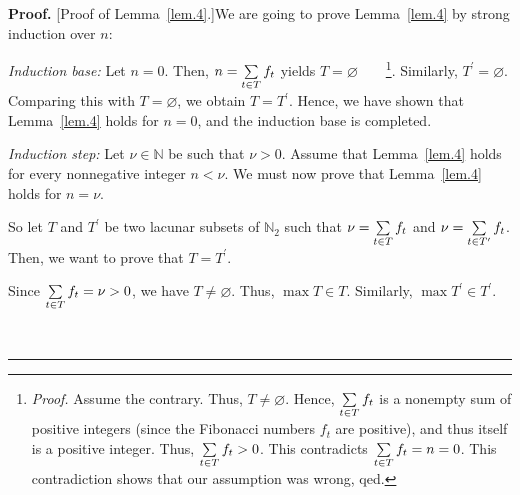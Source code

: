 \documentclass[numbers=enddot,12pt,final,onecolumn,notitlepage]{scrartcl}%
\numberwithin{exer}{section}
\theoremstyle{definition}
\newenvironment{proof}[1][Proof]{\noindent\textbf{#1.} }{\ \rule{0.5em}{0.5em}}
\let\sumnonlimits\sum
\renewcommand{\sum}{\sumnonlimits\limits}
\begin{document}
\begin{proof}
[Proof of Lemma~\ref{lem.4}.]We are going to prove Lemma~\ref{lem.4} by strong
induction over $n$:

\textit{Induction base:} Let $n=0$. Then, $n=\sum\limits_{t\in T}f_{t}$ yields
$T=\varnothing$\ \ \ \ \footnote{\textit{Proof.} Assume the contrary. Thus, $T
\neq\varnothing$. Hence, $\sum\limits_{t\in T}f_{t}$ is a nonempty sum of
positive integers (since the Fibonacci numbers $f_{t}$ are positive), and thus
itself is a positive integer. Thus, $\sum\limits_{t\in T}f_{t} > 0$. This
contradicts $\sum\limits_{t\in T}f_{t} = n = 0$. This contradiction shows that
our assumption was wrong, qed.}. Similarly, $T^{\prime}=\varnothing$.
Comparing this with $T = \varnothing$, we obtain $T=T^{\prime}$. Hence, we
have shown that Lemma~\ref{lem.4} holds for $n=0$, and the induction base is completed.

\textit{Induction step:} Let $\nu\in\mathbb{N}$ be such that $\nu>0$. Assume
that Lemma~\ref{lem.4} holds for every nonnegative integer $n<\nu$. We must
now prove that Lemma~\ref{lem.4} holds for $n=\nu$.

So let $T$ and $T^{\prime}$ be two lacunar subsets of $\mathbb{N}_{2}$ such
that $\nu=\sum\limits_{t\in T}f_{t}$ and $\nu=\sum\limits_{t\in T^{\prime}%
}f_{t}$. Then, we want to prove that $T=T^{\prime}$.

Since $\sum\limits_{t\in T}f_{t}=\nu>0$, we have $T\neq\varnothing$. Thus,
$\max T\in T$. Similarly, $\max T^{\prime}\in T^{\prime}$.


\end{proof}
\end{document}
